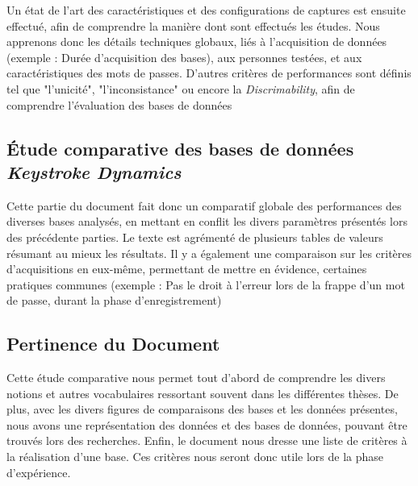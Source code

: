 Un état de l'art des caractéristiques et des configurations de captures est ensuite effectué, afin de comprendre la manière dont sont effectués les études.
Nous apprenons donc les détails techniques globaux, liés à l'acquisition de données (exemple : Durée d'acquisition des bases), aux personnes testées, et aux caractéristiques des mots de passes.
D'autres critères de performances sont  définis tel que "l'unicité", "l'inconsistance" ou encore la \textit{Discrimability}, afin de comprendre l'évaluation des bases de données

\subsection{Étude comparative des bases de données \textit{Keystroke Dynamics}}

Cette partie du document fait donc un comparatif globale des performances des diverses bases analysés, en mettant en conflit les divers paramètres présentés lors des précédente parties. Le texte est agrémenté de plusieurs tables de valeurs résumant au mieux les résultats.
Il y a également une comparaison sur les critères d'acquisitions en eux-même, permettant de mettre en évidence, certaines pratiques communes (exemple : Pas le droit à l'erreur lors de la frappe d'un mot de passe, durant la phase d'enregistrement)

\subsection{Pertinence du Document}

Cette étude comparative nous permet tout d'abord de comprendre les divers notions et autres vocabulaires ressortant souvent dans les différentes thèses.    
De plus, avec les divers figures de comparaisons des bases et les données présentes, nous avons une représentation des données et des bases de données, pouvant être trouvés lors des recherches.   
Enfin, le document nous dresse une liste de critères à la réalisation d'une base. Ces critères nous seront donc utile lors de la phase d'expérience.
